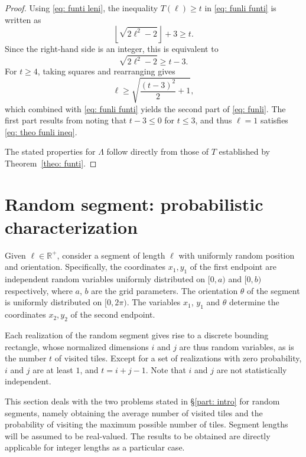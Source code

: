 \documentclass[12pt, a4paper]{article}
\newcommand{\funti}{T} %
\newcommand{\funli}{\Lambda} %
\newcommand{\len}{\ell} %
\newcommand{\leni}{\ell} %
\newcommand{\tiles}{t} %
\begin{document}
\begin{proof}
Using \eqref{eq: funti leni}, the inequality $\funti(\leni) \geq \tiles$ in \eqref{eq: funli funti} is written as
\begin{equation}
\left\lfloor \sqrt{2\leni^2-2} \right\rfloor + 3 \geq \tiles.
\end{equation}
Since the right-hand side is an integer, this is equivalent to
\begin{equation}
\label{eq: theo funli ineq}
\sqrt{2\leni^2-2} \geq \tiles-3.
\end{equation}
For $\tiles \geq 4$, taking squares and rearranging gives
\begin{equation}
\leni \geq \sqrt{\frac{(\tiles-3)^2} 2 + 1},
\end{equation}
which combined with \eqref{eq: funli funti} yields the second part of \eqref{eq: funli}. The first part results from noting that $\tiles-3 \leq 0$ for $\tiles \leq 3$, and thus $\leni=1$ satisfies \eqref{eq: theo funli ineq}.

The stated properties for $\funli$ follow directly from those of $\funti$ established by Theorem~\ref{theo: funti}.
\end{proof}


\section{Random segment: probabilistic characterization}
\label{part: rand}

Given $\len \in \mathbb R^+$, consider a segment of length $\len$ with uniformly random position and orientation. Specifically, the coordinates $x_1, y_1$ of the first endpoint are independent random variables uniformly distributed on $[0,a)$ and $[0,b)$ respectively, where $a$, $b$ are the grid parameters. The orientation $\theta$ of the segment is uniformly distributed on $[0,2\pi)$. The variables $x_1$, $y_1$ and $\theta$ determine the coordinates $x_2, y_2$ of the second endpoint.

Each realization of the random segment gives rise to a discrete bounding rectangle, whose normalized dimensions $i$ and $j$ are thus random variables, as is the number $\tiles$ of visited tiles. Except for a set of realizations with zero probability, $i$ and $j$ are at least $1$, and $\tiles = i+j-1$. Note that $i$ and $j$ are not statistically independent.

This section deals with the two problems stated in \S\ref{part: intro} for random segments, namely obtaining the average number of visited tiles and the probability of visiting the maximum possible number of tiles. Segment lengths will be assumed to be real-valued. The results to be obtained are directly applicable for integer lengths as a particular case.
\end{document}
